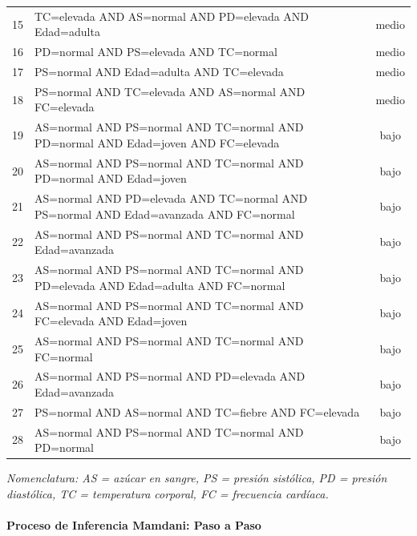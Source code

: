 \documentclass[11pt]{article}
\begin{document}
\begin{longtable}{cp{9cm}c}
    \midrule
    15 & TC=elevada AND AS=normal AND PD=elevada AND Edad=adulta                       & medio \\
    16 & PD=normal AND PS=elevada AND TC=normal                                        & medio \\
    17 & PS=normal AND Edad=adulta AND TC=elevada                                      & medio \\
    18 & PS=normal AND TC=elevada AND AS=normal AND FC=elevada                         & medio \\
    \midrule
    19 & AS=normal AND PS=normal AND TC=normal AND PD=normal AND Edad=joven AND FC=elevada & bajo  \\
    20 & AS=normal AND PS=normal AND TC=normal AND PD=normal AND Edad=joven            & bajo  \\
    21 & AS=normal AND PD=elevada AND TC=normal AND PS=normal AND Edad=avanzada AND FC=normal & bajo  \\
    22 & AS=normal AND PS=normal AND TC=normal AND Edad=avanzada                       & bajo  \\
    23 & AS=normal AND PS=normal AND TC=normal AND PD=elevada AND Edad=adulta AND FC=normal & bajo  \\
    24 & AS=normal AND PS=normal AND TC=normal AND FC=elevada AND Edad=joven           & bajo  \\
    25 & AS=normal AND PS=normal AND TC=normal AND FC=normal                           & bajo  \\
    26 & AS=normal AND PS=normal AND PD=elevada AND Edad=avanzada                      & bajo  \\
    27 & PS=normal AND AS=normal AND TC=fiebre AND FC=elevada                          & bajo  \\
    28 & AS=normal AND PS=normal AND TC=normal AND PD=normal                           & bajo  \\
\end{longtable}
\par{}

\textit{Nomenclatura: AS = az\'ucar en sangre, PS = presi\'on sist\'olica, PD = presi\'on diast\'olica, TC = temperatura corporal, FC = frecuencia card\'iaca.}

\paragraph{Proceso de Inferencia Mamdani: Paso a Paso}
\end{document}
